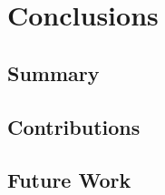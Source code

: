 \documentclass[../report.tex]{subfiles}
\begin{document}
    \section{Conclusions}
    \label{sec:conclusions}

    \subsection{Summary}
    \label{sec:conclusions:summary}

    \subsection{Contributions}
    \label{sec:conclusions:contributions}

    \subsection{Future Work}
    \label{sec:conclusions:future_work}
\end{document}
